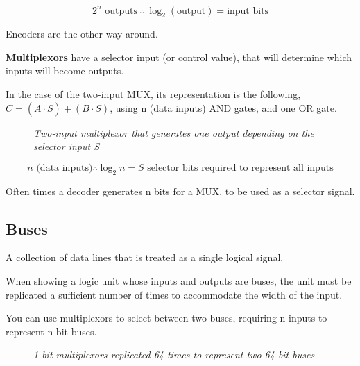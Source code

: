 \documentclass[11pt]{article}
\begin{document}
$$2^n \text{ outputs} \ \therefore \ \log_2{(\text{output})} = \text{input bits}$$

Encoders are the other way around.

\textbf{Multiplexors} have a selector input (or control value), that will determine which inputs will become outputs.

In the case of the two-input MUX, its representation is the following, $C=(A \cdot \overline{S}) +(B \cdot S)$, using n (data inputs) AND gates, and one OR gate.

\begin{figure}[htbp]
    \centering
    \caption{\textit{Two-input multiplexor that generates one output depending on the selector input S}}
\end{figure}

\vspace{-2.5em}
$$n \text{ (data inputs)} \therefore \log_2{n} = S \text{ selector bits required to represent all inputs}$$

Often times a decoder generates n bits for a MUX, to be used as a selector signal.

\subsection*{Buses}

A collection of data lines that is treated as a single logical signal.

When showing a logic unit whose inputs and outputs are buses, the unit must be replicated a sufficient number of times to accommodate the width of the input.

You can use multiplexors to select between two buses, requiring n inputs to represent n-bit buses.

\begin{figure}[htbp]
    \centering
    \caption{\textit{1-bit multiplexors replicated 64 times to represent two 64-bit buses}}
\end{figure}
\end{document}
